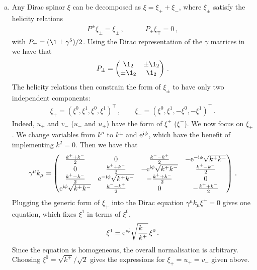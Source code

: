 \begin{enumerate}[a)]

\item Any Dirac spinor $\xi$ can be decomposed as $\xi = \xi_+ + \xi_-$, where $\xi_{\pm}$ satisfy the helicity relations
\begin{align}
P^{\pm} \xi_{\pm} =  \xi_{\pm} \,, \qquad \quad P_{\pm} \xi_{\mp} = 0 \,,
\end{align}
with $P_{\pm} = (\1 \pm \gamma^{5})/2$.
Using the Dirac representation of the $\gamma$ matrices in  we have that
\begin{align}
P_{\pm} = \begin{pmatrix} \1_2 & \pm \1_2 \\  \pm \1_2 & \1_2 \end{pmatrix} \,.
\end{align}
The helicity relations then constrain the form of  $\xi_{\pm}$ to have only two independent components:
\begin{align}
 \xi_{+} = \left(\xi^0, \xi^1, \xi^0, \xi^1 \right)^{\top} \,, \qquad  \xi_{-} = \left(\xi^0, \xi^1, -\xi^0, -\xi^1 \right)^{\top} \,.
\end{align}
Indeed, $u_+$ and $v_-$ ($u_-$ and $u_+$) have the form of $\xi^+$ ($\xi^-$). We now focus on $\xi_+$. We change variables from $k^{\mu}$ to $k^{\pm}$ and $\mathrm{e}^{\mathrm{i} \phi}$, which have the benefit of implementing $k^2=0$. Then we have that 
\begin{align}
\gamma^{\mu} k_{\mu} = \begin{pmatrix} 
\frac{k^++k^-}{2}  & 0 & \frac{k^--k^+}{2} & - \mathrm{e}^{-\mathrm{i} \phi} \sqrt{k^+ k^-} \\
0 & \frac{k^++k^-}{2} & - \mathrm{e}^{\mathrm{i} \phi} \sqrt{k^+ k^-} & \frac{k^+-k^-}{2} \\
\frac{k^+-k^-}{2} & \mathrm{e}^{-\mathrm{i} \phi} \sqrt{k^+ k^-} & - \frac{k^++k^-}{2} & 0 \\
 \mathrm{e}^{\mathrm{i} \phi} \sqrt{k^+ k^-} & \frac{k^--k^+}{2} & 0 & -\frac{k^++k^-}{2} \\
 \end{pmatrix} \,.
\end{align}
Plugging the generic form of $\xi_{+}$ into the Dirac equation $\gamma^{\mu} k_{\mu} \xi^+ = 0$ gives one equation, which fixes $\xi^1$ in terms of $\xi^0$,
\begin{align}
\xi^1 = \mathrm{e}^{\mathrm{i} \phi} \sqrt{\frac{k^-}{k^+}} \, \xi^0 \,.
\end{align}
Since the equation is homogeneous, the overall normalisation is arbitrary. Choosing $\xi^0 = \sqrt{k^+}/\sqrt{2}$ gives the expressions for $\xi_+=u_+=v_-$ given above.


\end{enumerate}
